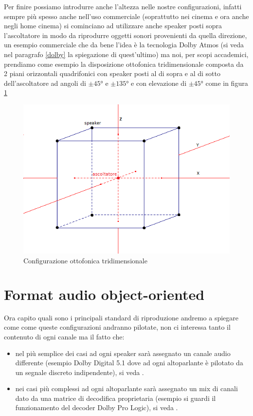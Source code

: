 \documentclass[12pt,a4paper]{report}
\begin{document}
Per finire possiamo introdurre anche l'altezza nelle nostre configurazioni, infatti sempre più spesso anche nell'uso commerciale (soprattutto nei cinema e ora anche negli home cinema) si cominciano ad utilizzare anche speaker posti sopra l'ascoltatore in modo da riprodurre oggetti sonori provenienti da quella direzione, un esempio commerciale che da bene l'idea è la tecnologia Dolby Atmos (si veda nel paragrafo \ref{dolby} la spiegazione di quest'ultimo) ma noi, per scopi accademici, prendiamo come esempio la disposizione ottofonica tridimensionale composta da 2 piani orizzontali quadrifonici con speaker posti al di sopra e al di sotto dell'ascoltatore ad angoli di $\pm45°$ e $\pm135°$ e con elevazione di $\pm 45°$ come in figura \ref{fig:ottofonia}

\begin{figure}[htbp]
	\centering
	\includegraphics[scale=0.70]{figures/cubo4.png}
	\caption {Configurazione ottofonica tridimensionale}
	\label{fig:ottofonia}
	\end{figure}

\section{Format audio object-oriented}

Ora capito quali sono i principali standard di riproduzione andremo a spiegare come come queste configurazioni andranno pilotate, non ci interessa tanto il contenuto di ogni canale ma il fatto che:

\begin{itemize}
\item nel più semplice dei casi ad ogni speaker sarà assegnato un canale audio differente (esempio Dolby Digital 5.1 dove ad ogni altoparlante è pilotato da un segnale discreto indipendente), si veda \cite{digital}.
\item nei casi più complessi ad ogni altoparlante sarà assegnato un mix di canali dato da una matrice di decodifica proprietaria (esempio si guardi il funzionamento del decoder Dolby Pro Logic), si veda \cite{prologic}.
\end{itemize}
\end{document}

